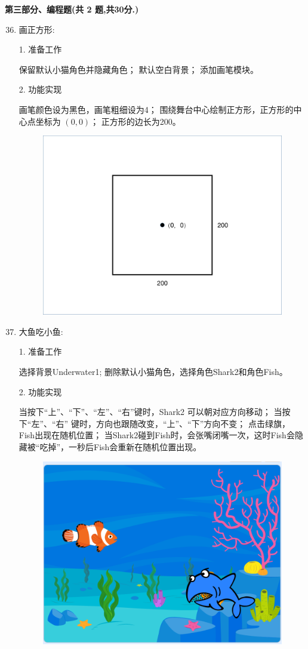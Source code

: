 \documentclass[10pt, a4paper]{article}
\begin{document}
    \newpage
    {\noindent \textbf{第三部分、编程题(共 2 题,共30分.)}}
    \begin{enumerate}
        \setcounter{enumi}{35}
        
        \item 画正方形:
        
        1. 准备工作
        \begin{tasks}[label = (\arabic*)]
            \task 保留默认小猫角色并隐藏角色；
            \task 默认空白背景；
            \task 添加画笔模块。
        \end{tasks}
        2. 功能实现
        \begin{tasks}[label = (\arabic*)]
            \task 画笔颜色设为黑色，画笔粗细设为4；
            \task 围绕舞台中心绘制正方形，正方形的中心点坐标为 $(0, 0)$；
            \task 正方形的边长为200。
        \end{tasks}
        \begin{figure}[htbp]
            \centering
            \includegraphics[width=.3\textwidth]{36.png}
        \end{figure}

        \item 大鱼吃小鱼:
        
        1. 准备工作
        \begin{tasks}[label = (\arabic*)]
            \task 选择背景Underwater1;
            \task 删除默认小猫角色，选择角色Shark2和角色Fish。
        \end{tasks}
        2. 功能实现
        \begin{tasks}[label = (\arabic*)]
            \task 当按下“上”、“下”、“左”、“右”键时，Shark2 可以朝对应方向移动；
            \task 当按下“左”、“右” 键时，方向也跟随改变，“上”、“下”方向不变；
            \task 点击绿旗，Fish出现在随机位置；
            \task 当Shark2碰到Fish时，会张嘴闭嘴一次，这时Fish会隐藏被“吃掉”，一秒后Fish会重新在随机位置出现。
        \end{tasks}
        \begin{figure}[htbp]
            \centering
            \includegraphics[width=.3\textwidth]{37.png}
        \end{figure}
    \end{enumerate}
\end{document}

